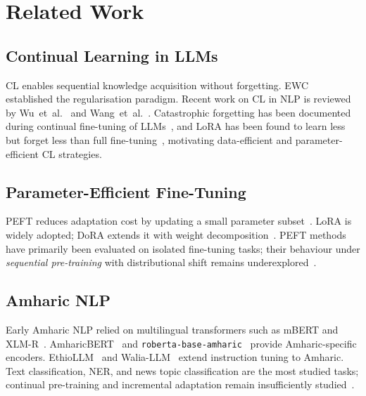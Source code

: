 \documentclass[11pt,a4paper]{article}
\begin{document}
\section{Related Work}
\label{sec:relatedwork}

\subsection{Continual Learning in LLMs}

CL enables sequential knowledge acquisition without forgetting.
EWC~\cite{Kirkpatrick2017} established the regularisation paradigm.
Recent work on CL in NLP is reviewed by Wu~et~al.~\cite{Wu2024survey}
and Wang~et~al.~\cite{Wang2024comprehensive}.
Catastrophic forgetting has been documented during continual
fine-tuning of LLMs~\cite{Luo2023}, and LoRA has been found to learn
less but forget less than full fine-tuning~\cite{Biderman2024},
motivating data-efficient and parameter-efficient CL strategies.

\subsection{Parameter-Efficient Fine-Tuning}

PEFT reduces adaptation cost by updating a small parameter
subset~\cite{Houlsby2019,Hu2022LoRA,Ding2023}.  LoRA is widely
adopted; DoRA extends it with weight decomposition~\cite{Liu2024DoRA}.
PEFT methods have primarily been evaluated on isolated fine-tuning
tasks; their behaviour under \emph{sequential pre-training} with
distributional shift remains underexplored~\cite{Wang2023survey,Wu2022FT}.

\subsection{Amharic NLP}

Early Amharic NLP relied on multilingual transformers such as mBERT
and XLM-R~\cite{Adelani2023}.  AmharicBERT~\cite{Azime2021} and
\texttt{roberta-base-amharic}~\cite{Yohannes2022,Marilign2025}
provide Amharic-specific encoders.  EthioLLM~\cite{Tonja2024EthioLLM}
and Walia-LLM~\cite{Azime2024Walia} extend instruction tuning to
Amharic.  Text classification, NER, and news topic classification are
the most studied tasks; continual pre-training and incremental
adaptation remain insufficiently studied~\cite{Alebachew2025}.
\end{document}
